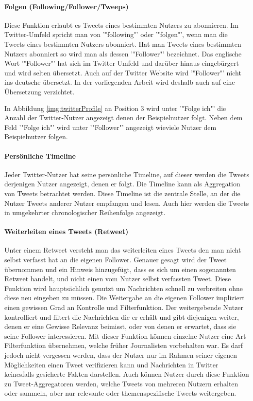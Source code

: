 			\paragraph{Folgen (Following/Follower/Tweeps)}
				Diese Funktion erlaubt es Tweets eines bestimmten Nutzers zu abonnieren. 
				Im Twitter-Umfeld spricht man von '"following"' oder '"folgen"', wenn man die Tweets eines bestimmten Nutzers abonniert.
				Hat man Tweets eines bestimmten Nutzers abonniert so wird man als dessen '"Follower"' bezeichnet. 
				Das englische Wort '"Follower"' hat sich im Twitter-Umfeld und darüber hinaus eingebürgert und wird selten übersetzt. 
				Auch auf der Twitter Website wird '"Follower"' nicht ins deutsche übersetzt.
				In der vorliegenden Arbeit wird deshalb auch auf eine Übersetzung verzichtet. 

				In Abbildung \ref{img:twitterProfile} an Position 3 wird unter '"Folge ich"' die Anzahl der Twitter-Nutzer angezeigt denen der Beispielnutzer folgt. 
				Neben dem Feld '"Folge ich"' wird unter '"Follower"' angezeigt wieviele Nutzer dem Beispielnutzer folgen.

			\paragraph{Persönliche Timeline}
				Jeder Twitter-Nutzer hat seine persönliche Timeline, auf dieser werden die Tweets derjenigen Nutzer angezeigt, denen er folgt. 
				Die Timeline kann als Aggregation von Tweets betrachtet werden.
				Diese Timeline ist die zentrale Stelle, an der die Nutzer Tweets anderer Nutzer empfangen und lesen.
				Auch hier werden die Tweets in umgekehrter chronologischer Reihenfolge angezeigt.  

			\paragraph{Weiterleiten eines Tweets (Retweet)}
				Unter einem Retweet versteht man das weiterleiten eines Tweets den man nicht selbst verfasst hat an die eigenen Follower.
				Genauer gesagt wird der Tweet übernommen und ein Hinweis hinzugefügt, dass es sich um einen sogenannten Retweet handelt, und nicht einen vom Nutzer selbst verfassten Tweet.
				Diese Funktion wird hauptsächlich genutzt um Nachrichten schnell zu verbreiten ohne diese neu eingeben zu müssen. 
				Die Weitergabe an die eigenen Follower impliziert einen gewissen Grad an Kontrolle und Filterfunktion. 
				Der weitergebende Nutzer kontrolliert und filtert die Nachrichten die er erhält und gibt diejenigen weiter, denen er eine Gewisse Relevanz beimisst, oder von denen er erwartet, dass sie seine Follower interessieren. 
				Mit dieser Funktion können einzelne Nutzer eine Art Filterfunktion übernehmen, welche früher Journalisten vorbehalten war. 
				Es darf jedoch nicht vergessen werden, dass der Nutzer nur im Rahmen seiner eigenen Möglichkeiten einen Tweet verifizieren kann und Nachrichten in Twitter keinesfalls gesicherte Fakten darstellen.
				Auch können Nutzer durch diese Funktion zu Tweet-Aggregatoren werden, welche Tweets von mehreren Nutzern erhalten oder sammeln, aber nur relevante oder themenspezifische Tweets weitergeben.

